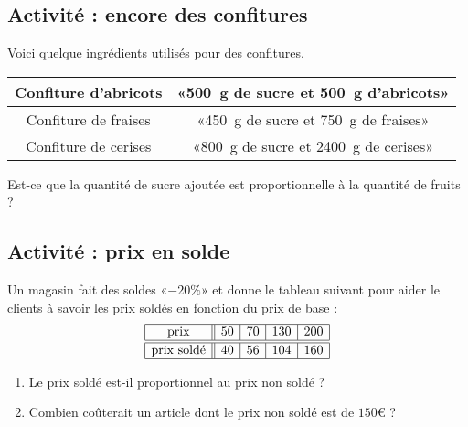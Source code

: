 
\subsection*{Activité : encore des confitures}

Voici quelque ingrédients utilisés pour des confitures.
\begin{center}
    \begin{tabular}[]{|c|c|}
        \hline
        Confiture d'abricots& «\SI{500}{\gram} de sucre et \SI{500}{\gram} d'abricots» \\
        \hline
        Confiture de fraises&«\SI{450}{\gram} de sucre et \SI{750}{\gram} de fraises» \\
        \hline
        Confiture de cerises&  «\SI{800}{\gram} de sucre et \SI{2400}{\gram} de cerises» \\ 
        \hline
    \end{tabular}
\end{center}
Est-ce que la quantité de sucre ajoutée est proportionnelle à la quantité de fruits ?

\subsection*{Activité : prix en solde}

Un magasin fait des soldes «\( -20\%\)» et donne le tableau suivant pour aider le clients à savoir les prix soldés en fonction du prix de base :
\begin{equation*}
    \begin{array}[]{|c||c|c|c|c|}
        \hline
        \text{prix}&50&70&130&200\\
        \hline\hline
        \text{prix soldé}&40&56&104&160\\
        \hline
    \end{array}
\end{equation*}
\begin{enumerate}
    \item
        Le prix soldé est-il proportionnel au prix non soldé ?
    \item
        Combien coûterait un article dont le prix non soldé est de \( 150\)€ ?
\end{enumerate}
